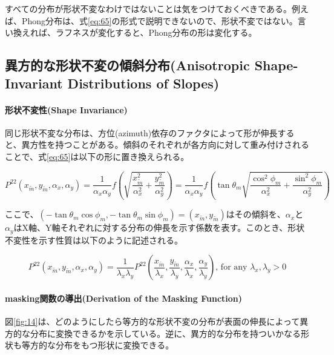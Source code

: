 \documentclass[a4j,xelatex,ja=standard]{bxjsarticle}
\begin{document}
すべての分布が形状不変なわけではないことは気をつけておくべきである。例えば、Phong分布は、式\eqref{eq:65}の形式で説明できないので、形状不変ではない。言い換えれば、ラフネスが変化すると、Phong分布の形は変化する。

\subsection{異方的な形状不変の傾斜分布(Anisotropic Shape-Invariant Distributions of Slopes)}

\paragraph{形状不変性(Shape Invariance)}

同じ形状不変な分布は、方位(azimuth)依存のファクタによって形が伸長すると、異方性を持つことがある。傾斜のそれぞれが各方向に対して重み付けされることで、式\eqref{eq:65}は以下の形に置き換えられる。

\begin{equation}
    P^{22}(x_{\tilde{m}}, y_{\tilde{m}}, \alpha_x, \alpha_y) = \frac{1}{\alpha_x \alpha_y} f \left( \sqrt{\frac{x_{\tilde{m}}^2}{\alpha_x^2} + \frac{y_{\tilde{m}}^2}{\alpha_y^2}} \right) = \frac{1}{\alpha_x \alpha_y} f \left( \tan \theta_m \sqrt{\frac{\cos^2 \phi_m}{\alpha_x^2} + \frac{\sin^2 \phi_m}{\alpha_y^2}} \right)
    \label{eq:73}
\end{equation}

ここで、$(-\tan\theta_m \cos\phi_m, -\tan\theta_m \sin\phi_m) = (x_{\tilde{m}}, y_{\tilde{m}})$はその傾斜を、$\alpha_x$と$\alpha_y$はX軸、Y軸それぞれに対する分布の伸長を示す係数を表す。このとき、形状不変性を示す性質は以下のように記述される。

\begin{equation}
    P^{22}(x_{\tilde{m}}, y_{\tilde{m}}, \alpha_x, \alpha_y) = \frac{1}{\lambda_x \lambda_y} P^{22}(\frac{x_{\tilde{m}}}{\lambda_x}, \frac{y_{\tilde{m}}}{\lambda_y}, \frac{\alpha_x}{\lambda_x}, \frac{\alpha_y}{\lambda_y}) \text{, for any } \lambda_x, \lambda_y > 0
    \label{eq:74}
\end{equation}

\paragraph{masking関数の導出(Derivation of the Masking Function)}

図\ref{fig:14}は、どのようにしたら等方的な形状不変の分布が表面の伸長によって異方的な分布に変換できるかを示している。逆に、異方的な分布を持ついかなる形状も等方的な分布をもつ形状に変換できる。
\end{document}
